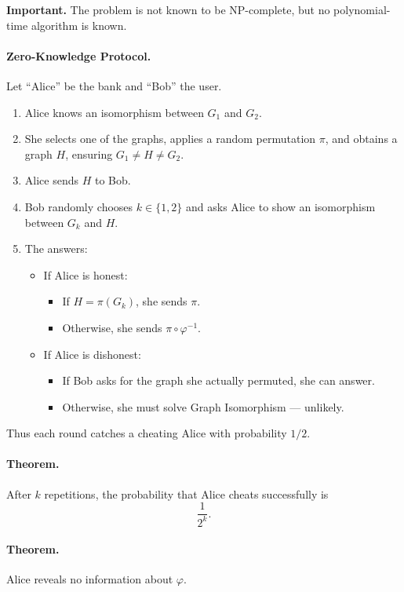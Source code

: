 \documentclass{article}
\begin{document}
\textbf{Important.}  
The problem is not known to be NP-complete, but no polynomial-time algorithm is known.

\paragraph{Zero-Knowledge Protocol.}
Let ``Alice'' be the bank and ``Bob'' the user.

\begin{enumerate}
    \item Alice knows an isomorphism between \(G_1\) and \(G_2\).
    \item She selects one of the graphs, applies a random permutation \(\pi\), and obtains a graph \(H\), ensuring \(G_1 \neq H \neq G_2\).
    \item Alice sends \(H\) to Bob.
    \item Bob randomly chooses \(k \in \{1,2\}\) and asks Alice to show an isomorphism between \(G_k\) and \(H\).
    \item The answers:
    \begin{itemize}
        \item If Alice is honest:  
        \begin{itemize}
            \item If \(H = \pi(G_k)\), she sends \(\pi\).  
            \item Otherwise, she sends \(\pi \circ \varphi^{-1}\).
        \end{itemize}
        \item If Alice is dishonest:  
        \begin{itemize}
            \item If Bob asks for the graph she actually permuted, she can answer.  
            \item Otherwise, she must solve Graph Isomorphism — unlikely.
        \end{itemize}
    \end{itemize}
\end{enumerate}

Thus each round catches a cheating Alice with probability \(1/2\).

\paragraph{Theorem.}
After \(k\) repetitions, the probability that Alice cheats successfully is
\[
\frac{1}{2^k}.
\]

\paragraph{Theorem.}
Alice reveals no information about \(\varphi\).
\end{document}
